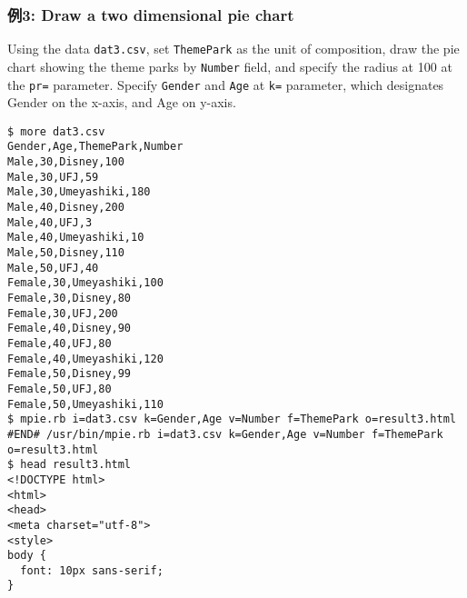 \begin{flushleft}
\end{flushleft}


\subsubsection*{例3: Draw a two dimensional pie chart}

Using the data \verb|dat3.csv|, set \verb|ThemePark| as the unit of composition, draw the pie chart showing the theme parks by \verb|Number| field, and specify the radius at 100 at the \verb|pr=| parameter. Specify \verb|Gender| and \verb|Age| at \verb|k=| parameter, which designates Gender on the x-axis, and Age on y-axis.


\begin{Verbatim}[baselinestretch=0.7,frame=single]
$ more dat3.csv
Gender,Age,ThemePark,Number
Male,30,Disney,100
Male,30,UFJ,59
Male,30,Umeyashiki,180
Male,40,Disney,200
Male,40,UFJ,3
Male,40,Umeyashiki,10
Male,50,Disney,110
Male,50,UFJ,40
Female,30,Umeyashiki,100
Female,30,Disney,80
Female,30,UFJ,200
Female,40,Disney,90
Female,40,UFJ,80
Female,40,Umeyashiki,120
Female,50,Disney,99
Female,50,UFJ,80
Female,50,Umeyashiki,110
$ mpie.rb i=dat3.csv k=Gender,Age v=Number f=ThemePark o=result3.html
#END# /usr/bin/mpie.rb i=dat3.csv k=Gender,Age v=Number f=ThemePark o=result3.html
$ head result3.html
<!DOCTYPE html>
<html>
<head>
<meta charset="utf-8">
<style>
body {
  font: 10px sans-serif;
}
\end{Verbatim}

\begin{flushleft}
\end{flushleft}


